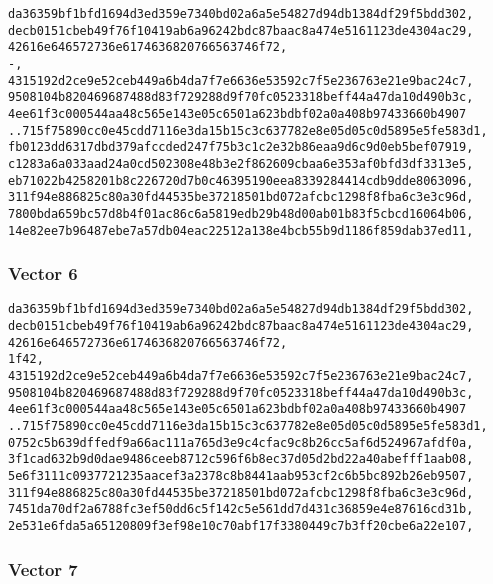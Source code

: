 \documentclass[
]{article}
\begin{document}
\begin{verbatim}
da36359bf1bfd1694d3ed359e7340bd02a6a5e54827d94db1384df29f5bdd302,
decb0151cbeb49f76f10419ab6a96242bdc87baac8a474e5161123de4304ac29,
42616e646572736e6174636820766563746f72,
-,
4315192d2ce9e52ceb449a6b4da7f7e6636e53592c7f5e236763e21e9bac24c7,
9508104b820469687488d83f729288d9f70fc0523318beff44a47da10d490b3c,
4ee61f3c000544aa48c565e143e05c6501a623bdbf02a0a408b97433660b4907
..715f75890cc0e45cdd7116e3da15b15c3c637782e8e05d05c0d5895e5fe583d1,
fb0123dd6317dbd379afccded247f75b3c1c2e32b86eaa9d6c9d0eb5bef07919,
c1283a6a033aad24a0cd502308e48b3e2f862609cbaa6e353af0bfd3df3313e5,
eb71022b4258201b8c226720d7b0c46395190eea8339284414cdb9dde8063096,
311f94e886825c80a30fd44535be37218501bd072afcbc1298f8fba6c3e3c96d,
7800bda659bc57d8b4f01ac86c6a5819edb29b48d00ab01b83f5cbcd16064b06,
14e82ee7b96487ebe7a57db04eac22512a138e4bcb55b9d1186f859dab37ed11,
\end{verbatim}

\hypertarget{vector-6-1}{%
\subsubsection{Vector 6}\label{vector-6-1}}

\begin{verbatim}
da36359bf1bfd1694d3ed359e7340bd02a6a5e54827d94db1384df29f5bdd302,
decb0151cbeb49f76f10419ab6a96242bdc87baac8a474e5161123de4304ac29,
42616e646572736e6174636820766563746f72,
1f42,
4315192d2ce9e52ceb449a6b4da7f7e6636e53592c7f5e236763e21e9bac24c7,
9508104b820469687488d83f729288d9f70fc0523318beff44a47da10d490b3c,
4ee61f3c000544aa48c565e143e05c6501a623bdbf02a0a408b97433660b4907
..715f75890cc0e45cdd7116e3da15b15c3c637782e8e05d05c0d5895e5fe583d1,
0752c5b639dffedf9a66ac111a765d3e9c4cfac9c8b26cc5af6d524967afdf0a,
3f1cad632b9d0dae9486ceeb8712c596f6b8ec37d05d2bd22a40abefff1aab08,
5e6f3111c0937721235aacef3a2378c8b8441aab953cf2c6b5bc892b26eb9507,
311f94e886825c80a30fd44535be37218501bd072afcbc1298f8fba6c3e3c96d,
7451da70df2a6788fc3ef50dd6c5f142c5e561dd7d431c36859e4e87616cd31b,
2e531e6fda5a65120809f3ef98e10c70abf17f3380449c7b3ff20cbe6a22e107,
\end{verbatim}

\hypertarget{vector-7-1}{%
\subsubsection{Vector 7}\label{vector-7-1}}
\end{document}
